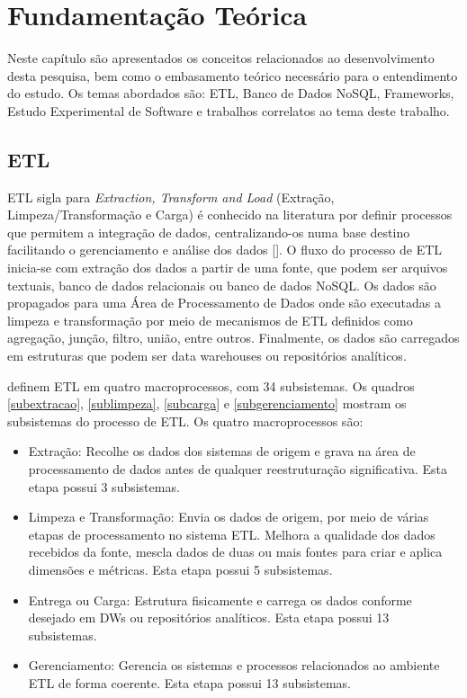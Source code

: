 \chapter{Fundamentação Teórica}

Neste capítulo são apresentados os conceitos relacionados ao desenvolvimento desta pesquisa, bem como o embasamento teórico necessário para o entendimento do estudo. Os temas abordados são: ETL, Banco de Dados NoSQL, Frameworks, Estudo Experimental de Software e trabalhos correlatos ao tema deste trabalho.


\clearpage

\section{ETL}

ETL sigla para \textit{Extraction, Transform and Load} (Extração, Limpeza/Transformação e Carga) é conhecido na literatura por definir processos que permitem a integração de dados, centralizando-os numa base destino facilitando o gerenciamento e análise dos dados [\cite{kimball:2004}]. O fluxo do processo de ETL inicia-se com extração dos dados a partir de uma fonte, que podem ser arquivos textuais, banco de dados relacionais ou banco de dados NoSQL. Os dados são propagados para uma Área de Processamento de Dados onde são executadas a limpeza e transformação por meio de mecanismos de ETL definidos como agregação, junção, filtro, união, entre outros. Finalmente, os dados são carregados em estruturas que podem ser data warehouses ou repositórios analíticos. 

\cite{kimball:2004} definem ETL em quatro macroprocessos, com 34 subsistemas. Os quadros \ref{subextracao}, \ref{sublimpeza}, \ref{subcarga} e \ref{subgerenciamento} mostram os subsistemas do processo de ETL. Os quatro macroprocessos são:

\begin{itemize}
	\item Extração: Recolhe os dados dos sistemas de origem e grava na área de processamento de dados antes de qualquer reestruturação significativa. Esta etapa possui 3 subsistemas.
	
	\item Limpeza e Transformação: Envia os dados de origem, por meio de várias etapas de processamento no sistema ETL. Melhora a qualidade dos dados recebidos da fonte, mescla dados de duas ou mais fontes para criar e aplica dimensões e métricas. Esta etapa possui 5 subsistemas.
	
	\item Entrega ou Carga: Estrutura fisicamente e carrega os dados conforme desejado em DWs ou repositórios analíticos. Esta etapa possui 13 subsistemas.
	
	\item Gerenciamento: Gerencia os sistemas e processos relacionados ao ambiente ETL de forma coerente. Esta etapa possui 13 subsistemas.
\end{itemize}
\clearpage

